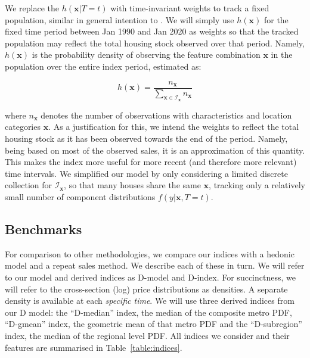 We replace the $h(\mathbf{x} \vert T = t)$ with time-invariant weights to track a fixed population, similar in general intention to \citet{mcmillen_shimizu2021}. We will simply use $h(\mathbf{x})$ for the fixed time period between Jan 1990 and Jan 2020 as weights so that the tracked population may reflect the total housing stock observed over that period. Namely, $h(\mathbf{x})$ is the probability density of observing the feature combination $\mathbf{x}$ in the population over the entire index period, estimated as: 

\begin{equation} \label{eq:weights}
	h(\mathbf{x}) = \frac{n_\mathbf{x}}{ \sum_{\mathbf{x} \in \mathcal{I}_\mathbf{x} } n_\mathbf{x} }
\end{equation}

where $n_\mathbf{x}$ denotes the number of observations with characteristics and location categories $\mathbf{x}$. As a justification for this, we intend the weights to reflect the total housing stock as it has been observed towards the end of the period. Namely, being based on most of the observed sales, it is an approximation of this quantity.
  This makes the index more useful for more recent (and therefore more relevant) time intervals.
We simplified our model by only considering a limited discrete collection for $\mathcal{I}_\mathbf{x}$, so that many houses share the same $\mathbf{x}$, tracking only a relatively small number of component distributions $f(y \vert \mathbf{x}, T = t)$.






\subsection{Benchmarks}
\label{sec:linear}

For comparison to other methodologies, we compare our indices with a hedonic model and a repeat sales method. We describe each of these in turn. We will refer to our model and derived indices as D-model and D-index. For succinctness, we will refer to the cross-section (log) price distributions as densities. A separate density is available at each \emph{specific time}. We will use three derived indices from our D model: the ``D-median'' index, the median of the composite metro PDF, ``D-gmean'' index, the geometric mean of that metro PDF and the ``D-subregion''  index, the median of the regional level PDF.
All indices we consider and their features are summarised in Table~\ref{table:indices}.

